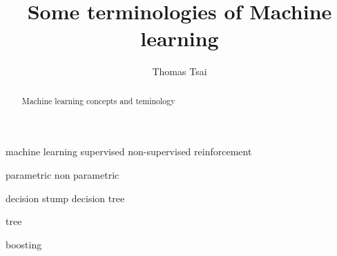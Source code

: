 \documentclass[a4paper,10pt]{report}
\title{Some terminologies of Machine learning}
\author{Thomas Tsai}
\begin{document}
\maketitle

\begin{abstract}
Machine learning concepts and teminology
\end{abstract}

machine learning
supervised
non-supervised
reinforcement

parametric
non parametric

decision stump
decision tree

tree

boosting
\end{document}
